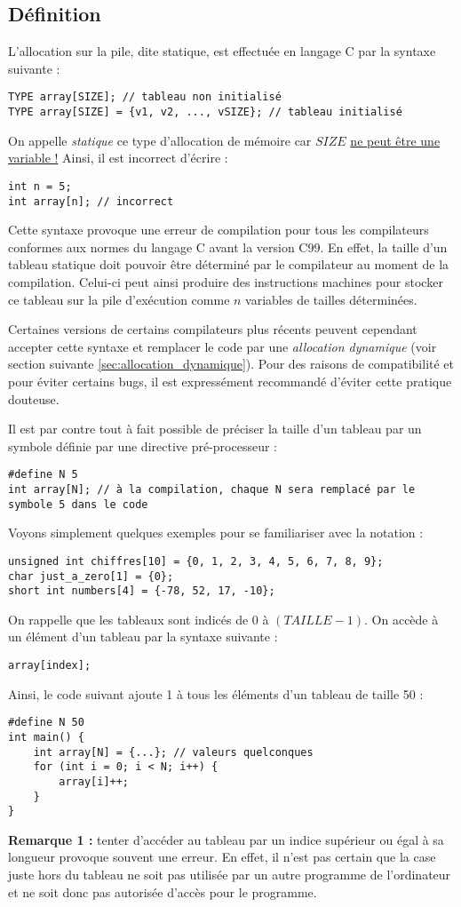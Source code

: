 \documentclass[../../../main.tex]{subfiles}
\begin{document}
\subsection{Définition}
\label{sub:d_finition}
L'allocation sur la pile, dite statique, est effectuée en langage C par la syntaxe suivante :
\begin{verbatim}
TYPE array[SIZE]; // tableau non initialisé
TYPE array[SIZE] = {v1, v2, ..., vSIZE}; // tableau initialisé
\end{verbatim}
On appelle \textit{statique} ce type d'allocation de mémoire car $SIZE$ \underline{ne peut être une variable !} Ainsi, il est incorrect d'écrire :
\begin{verbatim}
int n = 5;
int array[n]; // incorrect
\end{verbatim}
Cette syntaxe provoque une erreur de compilation pour tous les compilateurs conformes aux normes du langage C avant la version C99. 
En effet, la taille d'un tableau statique doit pouvoir être déterminé par le compilateur au moment de la compilation. Celui-ci peut ainsi produire des instructions machines pour stocker ce tableau sur la pile d'exécution comme $n$ variables de tailles déterminées.

Certaines versions de certains compilateurs plus récents peuvent cependant accepter cette syntaxe et remplacer le code par une \textit{allocation dynamique} (voir section suivante \ref{sec:allocation_dynamique}). Pour des raisons de compatibilité et pour éviter certains bugs, il est expressément recommandé d'éviter cette pratique douteuse.
 
Il est par contre tout à fait possible de préciser la taille d'un tableau par un symbole définie par une directive pré-processeur :
\begin{verbatim}
#define N 5
int array[N]; // à la compilation, chaque N sera remplacé par le symbole 5 dans le code
\end{verbatim}
Voyons simplement quelques exemples pour se familiariser avec la notation :
\begin{verbatim}
unsigned int chiffres[10] = {0, 1, 2, 3, 4, 5, 6, 7, 8, 9};
char just_a_zero[1] = {0};
short int numbers[4] = {-78, 52, 17, -10};
\end{verbatim}
On rappelle que les tableaux sont indicés de 0 à $(TAILLE - 1)$. On accède à un élément d'un tableau par la syntaxe suivante :
\begin{verbatim}
array[index];
\end{verbatim}
Ainsi, le code suivant ajoute 1 à tous les éléments d'un tableau de taille 50 :
\begin{verbatim}
#define N 50
int main() {
	int array[N] = {...}; // valeurs quelconques
	for (int i = 0; i < N; i++) {
		array[i]++;
	}
}
\end{verbatim}
\textbf{Remarque 1 :} tenter d'accéder au tableau par un indice supérieur ou égal à sa longueur provoque souvent une erreur. En effet, il n'est pas certain que la case juste hors du tableau ne soit pas utilisée par un autre programme de l'ordinateur et ne soit donc pas autorisée d'accès pour le programme.
 
\end{document}
